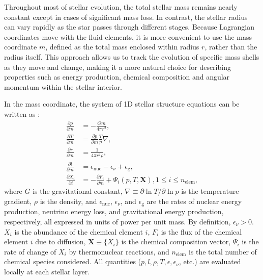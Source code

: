 \documentclass[12pt,a4paper]{article}
\newcommand{\mr}{\mathrm}
\newcommand{\pfird}[2][]{\frac{\partial#1}{\partial#2}}
\newcommand{\bvec}[1]{\boldsymbol{#1}}
\begin{document}
Throughout most of stellar evolution, the total stellar mass remains nearly constant except in cases of significant mass loss. In contrast, the stellar radius can vary rapidly as the star passes through different stages. Because Lagrangian coordinates move with the fluid elements, it is more convenient to use the mass coordinate $m$, defined as the total mass enclosed within radius $r$, rather than the radius itself. This approach allows us to track the evolution of specific mass shells as they move and change, making it a more natural choice for describing properties such as energy production, chemical composition and angular momentum within the stellar interior. 

In the mass coordinate, the system of 1D stellar structure equations can be written as \parencite[See, for example, ][]{KippenhahnEtAl2013}:
\begin{subequations}\label{eq:star_struct}
  \begin{align}
    \pfird[p]{m} &= -\frac{G m}{4\pi r^2}, \label{eq:star_struct1}\\
    \pfird[T]{m} &= \pfird[p]{m} \frac{T}{p} \nabla, \label{eq:star_struct2}\\
    \pfird[r]{m} &= \frac{1}{4 \pi r^2 \rho}, \label{eq:star_struct3}\\
    \pfird[l]{m} &= \epsilon_\mr{nuc}  - \epsilon_\nu + \epsilon_\mr{g} , \label{eq:star_struct4}\\
    \pfird[X_i]{t} &= -\pfird[F_i]{m} + \Psi_i(p, T, \bvec{X}), 1\leq i \leq n_\mr{elem}, \label{eq:star_struct5}
  \end{align}
\end{subequations}
where $G$ is the gravitational constant, $\nabla \equiv \partial \ln T/\partial \ln p$ is the temperature gradient, $\rho$ is the density, and $\epsilon_\mr{nuc}$, $\epsilon_\nu$, and $\epsilon_\mr{g}$ are the rates of nuclear energy production, neutrino energy loss, and gravitational energy production, respectively, all expressed in units of power per unit mass. By definition, $\epsilon_\nu > 0$. $X_i$ is the abundance of the chemical element $i$, $F_i$ is the flux of the chemical element $i$ due to diffusion, $\bvec{X} \equiv \{X_i\}$ is the chemical composition vector, $\Psi_i$ is the rate of change of $X_i$ by thermonuclear reactions, and $n_\mr{elem}$ is the total number of chemical species considered. All quantities ($p, l, \rho, T, \epsilon, \epsilon_\nu$, etc.) are evaluated locally at each stellar layer.
\end{document}
